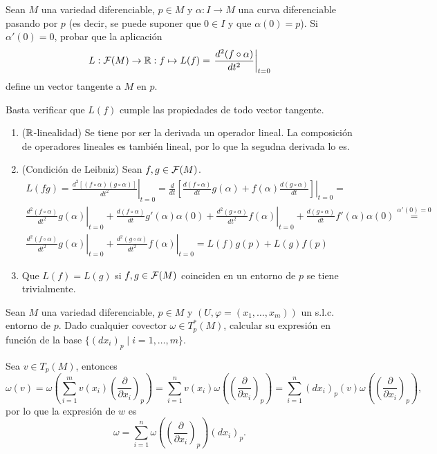 \documentclass[twoside]{article}
\begin{document}
\newpage

\begin{ejercicio}{3}
Sean $M$ una variedad diferenciable, $p \in M$ y $\alpha : I \to M$ una curva diferenciable
pasando por $p$ (es decir, se puede suponer que $0 \in I$ y que $\alpha(0) = p$).
Si $\alpha'(0) = 0$, probar que la aplicación
$$L:\mathcal{F}(M)\to\mathbb{R}:f\mapsto L(f)=\left.\frac{d^2(f\circ\alpha)}{dt^2}\right|_{t=0}$$
define un vector tangente a $M$ en $p$.
\end{ejercicio}
\begin{solucion}
Basta verificar que $L(f)$ cumple las propiedades de todo vector tangente. 
\begin{enumerate}
\item ($\mathbb{R}$-linealidad) Se tiene por ser la derivada un operador lineal. La composición de operadores lineales es también lineal, por lo que la segudna derivada lo es.
\item (Condición de Leibniz) Sean $f,g\in\mathcal{F}(M)$. 
\begin{gather*}
L(fg)=\left.\frac{d^2[(f\circ\alpha)(g\circ\alpha)]}{dt^2}\right|_{t=0}=\left.\frac{d}{dt}\left[\frac{d(f\circ\alpha)}{dt}g(\alpha)+f(\alpha)\frac{d(g\circ\alpha)}{dt}\right]\right|_{t=0}=\\
\left.\frac{d^2(f\circ\alpha)}{dt^2}g(\alpha)\right|_{t=0}+\frac{d(f\circ\alpha)}{dt}g'(\alpha)\alpha(0)+\left.\frac{d^2(g\circ\alpha)}{dt^2}f(\alpha)\right|_{t=0}+\frac{d(g\circ\alpha)}{dt}f'(\alpha)\alpha(0)\overset{\alpha'(0)=0}{=}\\
\left.\frac{d^2(f\circ\alpha)}{dt^2}g(\alpha)\right|_{t=0}+\left.\frac{d^2(g\circ\alpha)}{dt^2}f(\alpha)\right|_{t=0}=L(f)g(p)+L(g)f(p)
\end{gather*}
\item Que $L(f)=L(g)$ si $f,g\in\mathcal{F}(M)$ coinciden en un entorno de $p$ se tiene trivialmente.
\end{enumerate}
\end{solucion}

\newpage

\begin{ejercicio}{4}
Sean $M$ una variedad diferenciable, $p \in M$ y $(U, \varphi = (x_1, \dots , x_m))$ un s.l.c.
entorno de $p$. Dado cualquier covector $\omega \in T^*_p (M)$, calcular su expresión en
función de la base $\{(dx_i)_p \mid i = 1, \dots ,m\}$.
\end{ejercicio}
\begin{solucion}
Sea $v\in T_p(M)$, entonces
\[
\omega(v)=\omega\left(\sum_{i=1}^m v(x_i)\left(\frac{\partial}{\partial x_i}\right)_p\right)=\sum_{i=1}^nv(x_i)\omega\left(\left(\frac{\partial}{\partial x_i}\right)_p\right)=\sum_{i=1}^n(dx_i)_p(v)\omega\left(\left(\frac{\partial}{\partial x_i}\right)_p\right),
\]
por lo que la expresión de $w$ es
$$\omega=\sum_{i=1}^n\omega\left(\left(\frac{\partial}{\partial x_i}\right)_p\right)(dx_i)_p.$$
\end{solucion}
\end{document}
